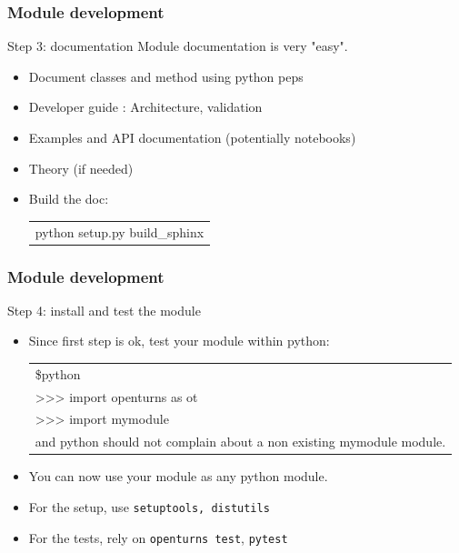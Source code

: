 \documentclass[8pt]{beamer}
\begin{document}
\begin{frame}
  \frametitle{Module development}
  \begin{block}{Step 3: documentation}
    Module documentation is very "easy". 
    \begin{itemize}
      \item Document classes and method using python peps
      \item Developer guide : Architecture, validation
      \item Examples and API documentation (potentially notebooks)
      \item Theory (if needed)
      \item Build the doc:
      \begin{tabular}{l}
        \ttfamily python setup.py build\_sphinx
      \end{tabular}
    \end{itemize}
  \end{block}
\end{frame}


\begin{frame}
  \frametitle{Module development}
  \begin{block}{Step 4: install and test the module}
    \begin{itemize}
    \item Since first step is ok, test your module within python:\\
      \begin{tabular}{l}
        \ttfamily \$python \\
        \ttfamily >>> import openturns as ot \\
        \ttfamily >>> import mymodule \\
      and python should not complain about a non existing mymodule module.
      \end{tabular}
      \item You can now use your module as any python module.
      \item For the setup, use \texttt{setuptools, distutils} 
      \item For the tests, rely on \texttt{openturns test}, \texttt{pytest} 
    \end{itemize}
  \end{block}
\end{frame}
\end{document}
